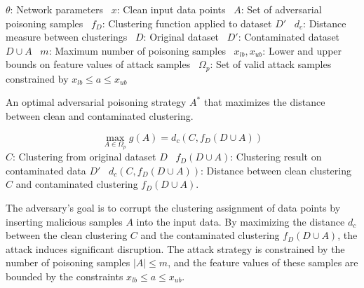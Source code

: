 $\theta$: Network parameters \ $x$: Clean input data points \ $A$: Set of adversarial poisoning samples \ $f_D$: Clustering function applied to dataset $D'$ \ $d_c$: Distance measure between clusterings \ $D$: Original dataset \ $D'$: Contaminated dataset $D \cup A$ \ $m$: Maximum number of poisoning samples \ $x_{lb}, x_{ub}$: Lower and upper bounds on feature values of attack samples \ $\Omega_p$: Set of valid attack samples constrained by $x_{lb} \leq a \leq x_{ub}$

An optimal adversarial poisoning strategy $A^*$ that maximizes the distance between clean and contaminated clustering.

\begin{equation} \max_{A \in \Omega_p} g(A) = d_c(C, f_D(D \cup A)) \end{equation}
$C$: Clustering from original dataset $D$ \ $f_D(D \cup A)$: Clustering result on contaminated data $D'$ \ $d_c(C, f_D(D \cup A))$: Distance between clean clustering $C$ and contaminated clustering $f_D(D \cup A)$.

The adversary's goal is to corrupt the clustering assignment of data points by inserting malicious samples $A$ into the input data. By maximizing the distance $d_c$ between the clean clustering $C$ and the contaminated clustering $f_D(D \cup A)$, the attack induces significant disruption. The attack strategy is constrained by the number of poisoning samples $|A| \leq m$, and the feature values of these samples are bounded by the constraints $x_{lb} \leq a \leq x_{ub}$.